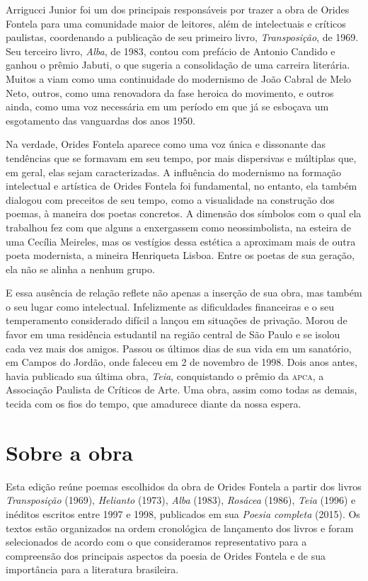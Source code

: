 Arrigucci Junior foi um dos
principais responsáveis por trazer a obra de Orides Fontela para uma
comunidade maior de leitores, além de intelectuais e críticos paulistas,
coordenando a publicação de seu primeiro livro, \emph{Transposição}, de
1969. Seu terceiro livro, \emph{Alba}, de 1983, contou com prefácio de
Antonio Candido e ganhou o prêmio Jabuti, o que sugeria a consolidação
de uma carreira literária. Muitos a viam como uma continuidade do
modernismo de João Cabral de Melo Neto, outros, como uma renovadora da
fase heroica do movimento, e outros ainda, como uma voz necessária em um
período em que já se esboçava um esgotamento das vanguardas dos anos
1950.

Na verdade, Orides Fontela aparece como uma voz única e dissonante das
tendências que se formavam em seu tempo, por mais dispersivas e
múltiplas que, em geral, elas sejam caracterizadas. A influência do
modernismo na formação intelectual e artística de Orides Fontela foi
fundamental, no entanto, ela também dialogou com preceitos de seu tempo,
como a visualidade na construção dos poemas, à maneira dos poetas
concretos. A dimensão dos símbolos com o qual ela trabalhou fez com que
alguns a enxergassem como neossimbolista, na esteira de uma Cecília
Meireles, mas os vestígios dessa estética a aproximam mais de outra
poeta modernista, a mineira Henriqueta Lisboa. Entre os poetas de sua
geração, ela não se alinha a nenhum grupo.

E essa ausência de relação reflete não apenas a inserção de sua obra,
mas também o seu lugar como intelectual. Infelizmente as dificuldades
financeiras e o seu temperamento considerado difícil a lançou em
situações de privação. Morou de favor em uma residência estudantil na
região central de São Paulo e se isolou cada vez mais dos amigos. Passou
os últimos dias de sua vida em um sanatório, em Campos do Jordão, onde
faleceu em 2 de novembro de 1998. Dois anos antes, havia publicado sua
última obra, \emph{Teia}, conquistando o prêmio da \textsc{apca}, a Associação
Paulista de Críticos de Arte. Uma obra, assim como todas as demais,
tecida com os fios do tempo, que amadurece diante da nossa espera.

\pagebreak

\section{Sobre a obra}

Esta edição reúne poemas escolhidos da obra de Orides Fontela a partir
dos livros \emph{Transposição} (1969), \emph{Helianto} (1973),
\emph{Alba} (1983), \emph{Rosácea} (1986), \emph{Teia} (1996) e inéditos
escritos entre 1997 e 1998, publicados em sua \emph{Poesia completa}
(2015). Os textos estão organizados na ordem cronológica de lançamento
dos livros e foram selecionados de acordo com o que consideramos
representativo para a compreensão dos principais aspectos da poesia de
Orides Fontela e de sua importância para a literatura brasileira.

